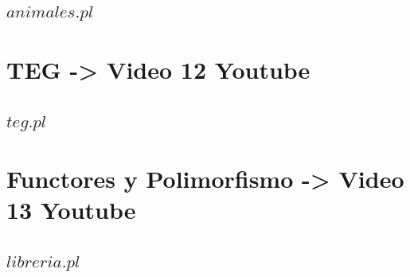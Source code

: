 \documentclass[11pt,a4paper]{article}
\begin{document}
\subsection{$animales.pl$}
 

\newpage

\section{TEG -> Video 12 Youtube}

\subsection{$teg.pl$}
 

\newpage

\section{Functores y Polimorfismo -> Video 13 Youtube}
\subsection{$libreria.pl$}
 
 
\newpage

\appendix


%
%
\end{document}
